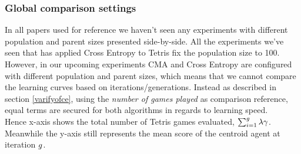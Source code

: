 \subsubsection{Global comparison settings}
In all papers used for reference we haven't seen any experiments with different population
and parent sizes presented side-by-side. All the experiments we've seen
that has applied Cross Entropy to Tetris fix the population size to 100. 
However, in our upcoming experiments
CMA and Cross Entropy are configured with different population and parent sizes, which means
that we cannot compare the learning curves based on iterations/generations. Instead as described
in section \ref{varifyofce}, using the  
\textit{number of games played} as comparison reference, equal terms are secured for both algorithms 
in regards to learning speed. \\
Hence x-axis shows the total number 
of Tetris games evaluated, 
$\sum_{i = 1}^{g} \lambda \gamma$. 
Meanwhile the y-axis still represents the mean score 
of the centroid agent at iteration $g$.